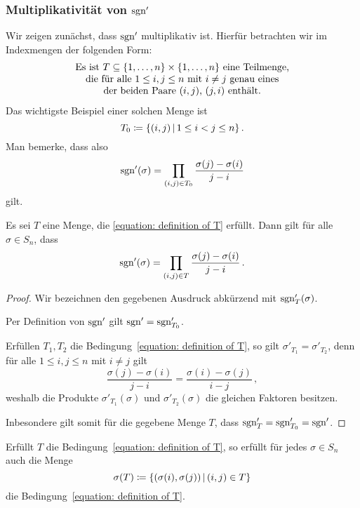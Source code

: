 \subsubsection*{Multiplikativität von $\operatorname{sgn}'$}

Wir zeigen zunächst, dass $\operatorname{sgn}'$ multiplikativ ist.
Hierfür betrachten wir im Indexmengen der folgenden Form:
\begin{equation}
\label{equation: definition of T}
  \begin{tabular}{c}
    Es ist $T \subseteq \{1, \dotsc, n\} \times \{1, \dotsc, n\}$ eine Teilmenge, \\
    die für alle $1 \leq i,j \leq n$ mit $i \neq j$ genau eines \\
    der beiden Paare $(i,j)$, $(j,i)$ enthält.
  \end{tabular}
\end{equation}
Das wichtigste Beispiel einer solchen Menge ist
\[
            T_0
  \defined  \{ (i,j) \suchthat 1 \leq i < j \leq n \} \,.
\]
Man bemerke, dass also
\[
    \operatorname{sgn}'(\sigma)
  = \prod_{(i,j) \in T_0} \frac{\sigma(j) - \sigma(i)}{j - i}
\]
gilt.


\begin{lemma}
  Es sei $T$ eine Menge, die \eqref{equation: definition of T} erfüllt.
  Dann gilt für alle $\sigma \in S_n$, dass
  \[
      \operatorname{sgn}'(\sigma)
    = \prod_{(i,j) \in T} \frac{\sigma(j) - \sigma(i)}{j - i} \,.
  \]
\end{lemma}

\begin{proof}
  Wir bezeichnen den gegebenen Ausdruck abkürzend mit $\operatorname{sgn}'_T(\sigma)$.
  
  Per Definition von $\operatorname{sgn}'$ gilt $\operatorname{sgn}' = \operatorname{sgn}'_{T_0}$.
  
  Erfüllen $T_1, T_2$ die Bedingung~\eqref{equation: definition of T}, so gilt $\sigma'_{T_1} = \sigma'_{T_2}$, denn für alle $1 \leq i, j \leq n$ mit $i \neq j$ gilt
  \[
      \frac{\sigma(j) - \sigma(i)}{j - i}
    = \frac{\sigma(i) - \sigma(j)}{i - j} \,,
  \]
  weshalb die Produkte $\sigma'_{T_1}(\sigma)$ und $\sigma'_{T_2}(\sigma)$ die gleichen Faktoren besitzen.
  
  Inbesondere gilt somit für die gegebene Menge $T$, dass $\operatorname{sgn}'_{T} = \operatorname{sgn}'_{T_0} = \operatorname{sgn}'$.
\end{proof}

\begin{lemma}
  Erfüllt $T$ die Bedingung~\eqref{equation: definition of T}, so erfüllt für jedes $\sigma \in S_n$ auch die Menge
  \[
              \sigma(T)
    \defined  \{(\sigma(i), \sigma(j)) \suchthat (i,j) \in T\}
  \]
  die Bedingung~\eqref{equation: definition of T}.
\end{lemma}

